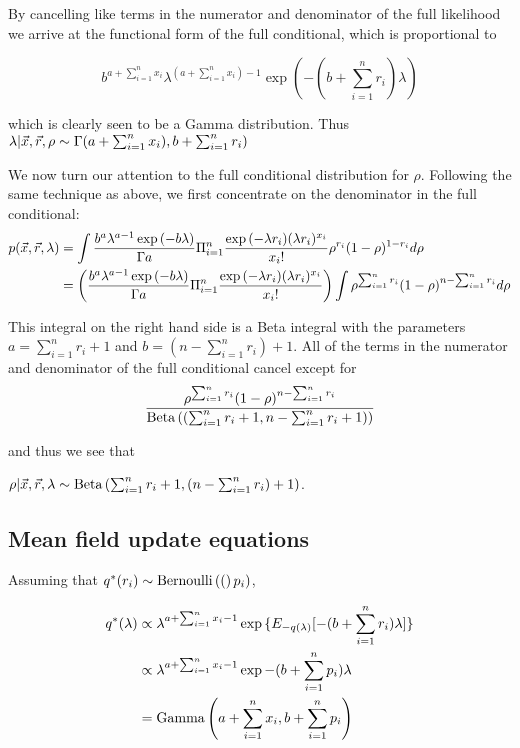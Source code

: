 \documentclass{amsart}
\begin{document}
By cancelling like terms in the numerator and denominator of the full likelihood we arrive 
at the functional form of the full conditional, which is proportional to

$$
b^{a+\sum_{i=1}^n x_i} \lambda^{(a + \sum_{i=1}^n x_i) - 1} \exp{(-(b + \sum_{i=1}^n r_i) \lambda)}
$$

which is clearly seen to be a Gamma distribution. Thus
$\lambda | \Vec{x}, \Vec{r}, \rho \sim \Gamma{(a + \sum_{i=1}^n x_i), b + \sum_{i=1}^n r_i)}$

We now turn our attention to the full conditional distribution for $\rho$. Following the same
technique as above, we first concentrate on the denominator in the full conditional:
\begin{align*}
p(\Vec{x}, \Vec{r}, \lambda) &= \int \frac{b^a \lambda^{a - 1} \exp{(-b \lambda)}}{\Gamma{a}} \Pi_{i=1}^n \frac{\exp{(-\lambda r_i)} (\lambda r_i)^{x_i}}{x_i !} \rho^{r_i} (1 - \rho)^{1 - r_i} d \rho \\
&= \left(\frac{b^a \lambda^{a - 1} \exp{(-b \lambda)}}{\Gamma{a}} \Pi_{i=1}^n \frac{\exp{(-\lambda r_i)} (\lambda r_i)^{x_i}}{x_i !} \right) \int \rho^{\sum_{i=1}^n r_i} (1 - \rho)^{n - \sum_{i=1}^n r_i} d \rho
\end{align*}

This integral on the right hand side is a Beta integral with the parameters
$a = \sum_{i=1}^n r_i + 1$ and $b = (n - \sum_{i=1}^n r_i) + 1$. All of the terms in the numerator and 
denominator of the full conditional cancel except for
$$
\frac{\rho^{\sum_{i=1}^n r_i} (1 - \rho)^{n - \sum_{i=1}^n r_i}}{\text{Beta} \left( (\sum_{i=1}^n r_i + 1, n - \sum_{i=1}^n r_i + 1) \right)}
$$

and thus we see that

$\rho | \Vec{x}, \Vec{r}, \lambda \sim \text{Beta} \left( \sum_{i=1}^n r_i + 1, (n - \sum_{i=1}^n r_i) + 1 \right)$.


\subsection{Mean field update equations}
Assuming that $q^*(r_i) \sim \text{Bernoulli} \left( ( \right)p_i)$,

\begin{align*}
q^*(\lambda) &\propto \lambda^{a+\sum_{i=1}^n x_i - 1} \exp{\{ E_{-q(\lambda)} [-(b + \sum_{i=1}^n r_i) \lambda] \}} \\
&\propto \lambda^{a+\sum_{i=1}^n x_i - 1} \exp{-(b + \sum_{i=1}^n p_i)\lambda} \\
&= \text{Gamma} \left( a+\sum_{i=1}^n x_i, b + \sum_{i=1}^n p_i \right)
\end{align*}
\end{document}
